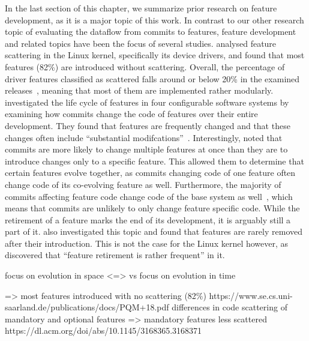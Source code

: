 In the last section of this chapter, we summarize prior research on feature development, as it is a major topic of this work.
In contrast to our other research topic of evaluating the dataflow from commits to features, feature development and related topics have been the focus of several studies.
\citet{passos2021scattering} analysed feature scattering in the Linux kernel, specifically its device drivers, and found that most features (82\%) are introduced without scattering.
Overall, the percentage of driver features classified as scattered falls around or below 20\% in the examined releases~\cite{passos2021scattering}, meaning that most of them are implemented rather modularly.
\citet{michelon2021lifecycle} investigated the life cycle of features in four configurable software systems by examining how commits change the code of features over their entire development.
They found that features are frequently changed and that these changes often include ``substantial modifcations''~\cite{michelon2021lifecycle}.
Interestingly, \citet{michelon2021lifecycle} noted that commits are more likely to change multiple features at once than they are to introduce changes only to a specific feature.
This allowed them to determine that certain features evolve together, as commits changing code of one feature often change code of its co-evolving feature as well.
Furthermore, the majority of commits affecting feature code change code of the base system as well~\cite{michelon2021lifecycle}, which means that commits are unlikely to only change feature specific code.
While the retirement of a feature marks the end of its development, it is arguably still a part of it.
\citet{michelon2021lifecycle} also investigated this topic and found that features are rarely removed after their introduction.
This is not the case for the Linux kernel however, as \citet{passos2013coevolution} discovered that ``feature retirement is rather frequent'' in it.

\iffalse
focus on evolution in space <=> vs focus on evolution in time

=> most features introduced with no scattering (82\%)
https://www.se.cs.uni-saarland.de/publications/docs/PQM+18.pdf
differences in code scattering of mandatory and optional features => mandatory features less scattered
https://dl.acm.org/doi/abs/10.1145/3168365.3168371


